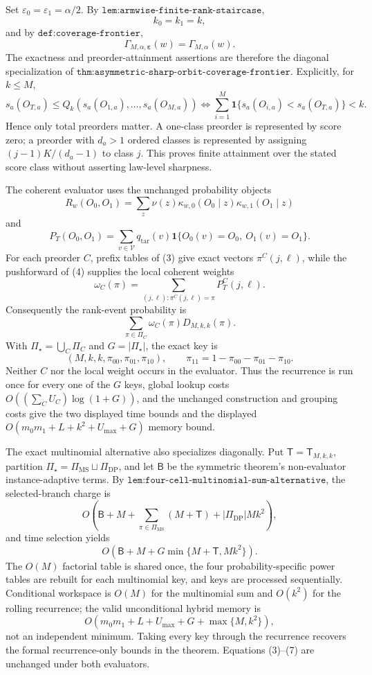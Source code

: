 Set \(\varepsilon_0=\varepsilon_1=\alpha/2\).  By \(\texttt{lem:armwise-finite-rank-staircase}\),
\[
k_0=k_1=k,
\]
and by \(\texttt{def:coverage-frontier}\),
\[
\Gamma_{M,\alpha,\boldsymbol\varepsilon}(w)=\Gamma_{M,\alpha}(w). \tag{1}
\]
The exactness and preorder-attainment assertions are therefore the diagonal specialization of \(\texttt{thm:asymmetric-sharp-orbit-coverage-frontier}\).  Explicitly, for \(k\le M\),
\[
s_a(O_{T,a})\le Q_k(s_a(O_{1,a}),\ldots,s_a(O_{M,a}))
\Longleftrightarrow
\sum_{i=1}^M\mathbf 1\{s_a(O_{i,a})<s_a(O_{T,a})\}<k. \tag{2}
\]
Hence only total preorders matter.  A one-class preorder is represented by score zero; a preorder with \(d_a>1\) ordered classes is represented by assigning \((j-1)K/(d_a-1)\) to class \(j\).  This proves finite attainment over the stated score class without asserting law-level sharpness.

The coherent evaluator uses the unchanged probability objects
\[
R_w(O_0,O_1)=\sum_z\nu(z)\kappa_{w,0}(O_0\mid z)\kappa_{w,1}(O_1\mid z) \tag{3}
\]
and
\[
P_T(O_0,O_1)=\sum_{v\in\mathcal V}q_{\mathrm{tar}}(v)
\mathbf 1\{O_0(v)=O_0,\ O_1(v)=O_1\}. \tag{4}
\]
For each preorder \(C\), prefix tables of (3) give exact vectors \(\pi^C(j,\ell)\), while the pushforward of (4) supplies the local coherent weights
\[
\omega_C(\pi)=\sum_{(j,\ell):\pi^C(j,\ell)=\pi}P_T^C(j,\ell). \tag{5}
\]
Consequently the rank-event probability is
\[
\sum_{\pi\in\Pi_C}\omega_C(\pi)D_{M,k,k}(\pi). \tag{6}
\]
With \(\Pi_\star=\bigcup_C\Pi_C\) and \(G=|\Pi_\star|\), the exact key is
\[
(M,k,k,\pi_{00},\pi_{01},\pi_{10}),\qquad
\pi_{11}=1-\pi_{00}-\pi_{01}-\pi_{10}. \tag{7}
\]
Neither \(C\) nor the local weight occurs in the evaluator.  Thus the recurrence is run once for every one of the \(G\) keys, global lookup costs \(O((\sum_CU_C)\log(1+G))\), and the unchanged construction and grouping costs give the two displayed time bounds and the displayed \(O(m_0m_1+L+k^2+U_{\max}+G)\) memory bound.

The exact multinomial alternative also specializes diagonally.  Put \(\mathsf T=\mathsf T_{M,k,k}\), partition \(\Pi_\star=\Pi_{\mathrm{MS}}\sqcup\Pi_{\mathrm{DP}}\), and let \(\mathsf B\) be the symmetric theorem's non-evaluator instance-adaptive terms.  By \(\texttt{lem:four-cell-multinomial-sum-alternative}\), the selected-branch charge is
\[
O\!\left(
\mathsf B+M+\sum_{\pi\in\Pi_{\mathrm{MS}}}(M+\mathsf T)
+|\Pi_{\mathrm{DP}}|Mk^2
\right), \tag{8}
\]
and time selection yields
\[
O\!\left(\mathsf B+M+G\min\{M+\mathsf T,Mk^2\}\right). \tag{9}
\]
The \(O(M)\) factorial table is shared once, the four probability-specific power tables are rebuilt for each multinomial key, and keys are processed sequentially.  Conditional workspace is \(O(M)\) for the multinomial sum and \(O(k^2)\) for the rolling recurrence; the valid unconditional hybrid memory is
\[
O(m_0m_1+L+U_{\max}+G+\max\{M,k^2\}), \tag{10}
\]
not an independent minimum.  Taking every key through the recurrence recovers the formal recurrence-only bounds in the theorem.  Equations (3)--(7) are unchanged under both evaluators.

